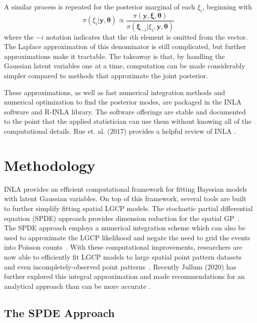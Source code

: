 \documentclass{interact}
\begin{document}
A similar process is repeated for the posterior marginal of each \(\xi_{i}\),
beginning with
\begin{equation}
\pi\left(\xi_{i} | \mathbf{y}, \boldsymbol{\theta}\right)
\propto \frac{\pi\left(\mathbf{y}, \boldsymbol{\xi}, \boldsymbol{\theta}\right)}
{\pi\left(\boldsymbol{\xi}_{-i} | \xi_{i}, \mathbf{y}, \boldsymbol{\theta}\right)}
\end{equation}
where the \(-i\) notation indicates that the \(i\)th element is omitted from
the vector. The Laplace approximation of this denominator is still complicated,
but further approximations make it tractable. The takeaway is that, by
handling the Gaussian latent variables one at a time, computation can be made
considerably simpler compared to methods that approximate the joint posterior.

These approximations, as well as fast numerical integration methods and
numerical optimization to find the posterior modes, are packaged in the INLA
software and R-INLA library. The software offerings are stable and documented
to the point that the applied statistician can use them without knowing all of
the computational details. Rue et. al. (2017) provides a helpful review of INLA \cite{rue2017bayesian}.


\section{Methodology}
\label{methods}

INLA provides an efficient computational framework for fitting Bayesian models
with latent Gaussian variables. On top of this framework, several tools are
built to further simplify fitting spatial LGCP models. The stochastic
partial differential equation (SPDE) approach provides dimension reduction for
the spatial GP~\cite{lindgrenetal}. The SPDE approach employs a numerical
integration scheme which can also be used to approximate the LGCP likelihood
and negate the need to grid the events into Poisson counts~\cite{simpsonetal}.
With these computational improvements, researchers are now able to efficiently
fit LGCP models to large spatial point pattern datasets and even
incompletely-observed point patterns~\cite{yuanetal}. Recently Jullum (2020) has further explored this integral approximation and made recommendations for an analytical approach than can be more accurate \cite{jullum2020}.


\subsection{The SPDE Approach}
\label{spde}
\end{document}
